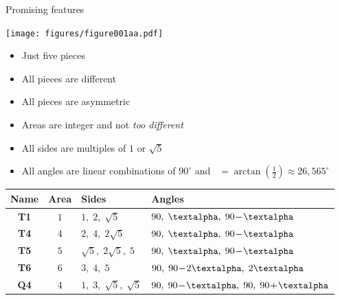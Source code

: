 \documentclass[14pt]{beamer}
\begin{document}
    \begin{frame}{Promising features}
        \begin{center}

            \begin{minipage}{17.5ex}\vspace{2ex}
                \texttt{[image: figures/figure001aa.pdf]}\\
            \end{minipage}\begin{minipage}{30ex}
                \footnotesize
                \begin{itemize}
                    \item Just five pieces
                    \item All pieces are different
                    \item All pieces are asymmetric
                    \item Areas are integer and not \emph{too different}
                    \item All sides are multiples of $1$ or $\sqrt{5}$
                    \item All angles are linear combinations of $90^\circ$ and \textalpha\ $= \arctan{\!\left(\tfrac{1}{2}\right)} \approx 26,565^\circ$
                \end{itemize}
            \end{minipage}

            \smallskip

            {\footnotesize
            \begin{tabular}{c|c|l|l}
                \;\;\textbf{Name}\;\; & \;\;\textbf{Area}\;\; & \;\;\textbf{Sides}          & \;\;\textbf{Angles} \\ \hline
                \textbf{T1}   & $1$           & \;\;$1,\; 2,\; \sqrt{5}$          & \;\;$90,\; \text{\textalpha},\; 90\!-\!\text{\textalpha}$   \\ \hline
                \textbf{T4}   & $4$           & \;\;$2,\; 4,\; 2\sqrt{5}$         & \;\;$90,\; \text{\textalpha},\; 90\!-\!\text{\textalpha}$   \\ \hline
                \textbf{T5}   & $5$           & \;\;$\sqrt{5},\; 2\sqrt{5},\; 5$  & \;\;$90,\; \text{\textalpha},\; 90\!-\!\text{\textalpha}$   \\ \hline
                \textbf{T6}   & $6$           & \;\;$3,\; 4,\; 5$                 & \;\;$90,\; 90\!-\!2\text{\textalpha},\; 2\text{\textalpha}$ \\ \hline
                \textbf{Q4}   & $4$           & \;\;$1,\; 3,\; \sqrt{5},\; \sqrt{5}$\;\; & \;\;$90,\; 90\!-\!\text{\textalpha},\; 90,\; 90\!+\!\text{\textalpha}$\;\;
            \end{tabular}}
        \end{center}
    \end{frame}
\end{document}
